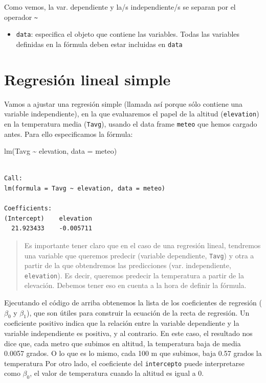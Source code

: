 \documentclass[
  letterpaper,
  DIV=11,
  numbers=noendperiod]{scrreprt}
\newenvironment{Shaded}{\begin{snugshade}}{\end{snugshade}}
\newcommand{\AttributeTok}[1]{\textcolor[rgb]{0.40,0.45,0.13}{#1}}
\newcommand{\FunctionTok}[1]{\textcolor[rgb]{0.28,0.35,0.67}{#1}}
\newcommand{\NormalTok}[1]{\textcolor[rgb]{0.00,0.23,0.31}{#1}}
\newcommand{\SpecialCharTok}[1]{\textcolor[rgb]{0.37,0.37,0.37}{#1}}
\providecommand{\tightlist}{%
  \setlength{\itemsep}{0pt}\setlength{\parskip}{0pt}}\usepackage{longtable,booktabs,array}
\begin{document}
Como vemos, la var. dependiente y la/s independiente/s se separan por el
operador \texttt{\textasciitilde{}}

\begin{itemize}
\tightlist
\item
  \texttt{data}: especifica el objeto que contiene las variables. Todas
  las variables definidas en la fórmula deben estar incluidas en
  \texttt{data}
\end{itemize}

\hypertarget{regresiuxf3n-lineal-simple}{%
\section{Regresión lineal simple}\label{regresiuxf3n-lineal-simple}}

Vamos a ajustar una regresión simple (llamada así porque sólo contiene
una variable independiente), en la que evaluaremos el papel de la
altitud (\texttt{elevation}) en la temperatura media (\texttt{Tavg}),
usando el data frame \texttt{meteo} que hemos cargado antes. Para ello
especificamos la fórmula:

\begin{Shaded}
\begin{Highlighting}[]
\FunctionTok{lm}\NormalTok{(Tavg }\SpecialCharTok{\textasciitilde{}}\NormalTok{ elevation, }\AttributeTok{data =}\NormalTok{ meteo)}
\end{Highlighting}
\end{Shaded}

\begin{verbatim}

Call:
lm(formula = Tavg ~ elevation, data = meteo)

Coefficients:
(Intercept)    elevation  
  21.923433    -0.005711  
\end{verbatim}

\begin{quote}
Es importante tener claro que en el caso de una regresión lineal,
tendremos una variable que queremos predecir (variable dependiente,
\texttt{Tavg}) y otra a partir de la que obtendremos las predicciones
(var. independiente, \texttt{elevation}). Es decir, queremos predecir la
temperatura a partir de la elevación. Debemos tener eso en cuenta a la
hora de definir la fórmula.
\end{quote}

Ejecutando el código de arriba obtenemos la lista de los coeficientes de
regresión (\(\beta_0\) y \(\beta_1\)), que son útiles para construir la
ecuación de la recta de regresión. Un coeficiente positivo indica que la
relación entre la variable dependiente y la variable independiente es
positiva, y al contrario. En este caso, el resultado nos dice que, cada
metro que subimos en altitud, la temperatura baja de media 0.0057
grados. O lo que es lo mismo, cada 100 m que subimos, baja 0.57 grados
la temperatura Por otro lado, el coeficiente del \texttt{intercepto}
puede interpretarse como \(\beta_0\), el valor de temperatura cuando la
altitud es igual a 0.
\end{document}
